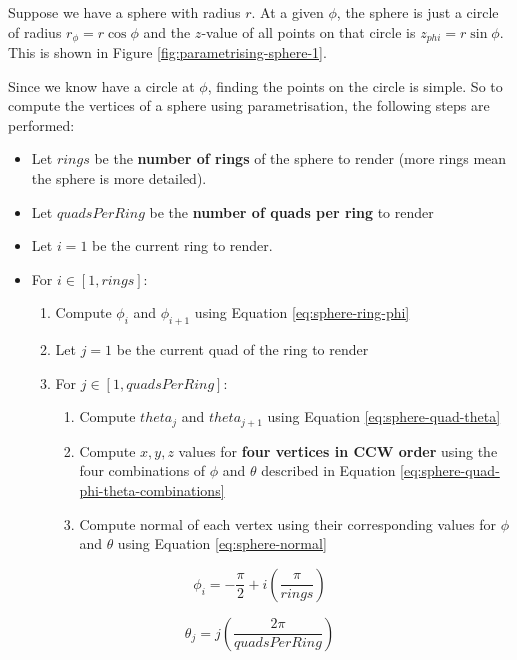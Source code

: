 \documentclass{article}
\begin{document}
Suppose we have a sphere with radius $r$. At a given $\phi$, the sphere is just a circle of radius $r_{\phi} = r \cos \phi$ and the $z$-value of all points on that circle is $z_{phi} = r \sin \phi$. This is shown in Figure \ref{fig:parametrising-sphere-1}.

Since we know have a circle at $\phi$, finding the points on the circle is simple. So to compute the vertices of a sphere using parametrisation, the following steps are performed:
\begin{itemize}
	\item Let $rings$ be the \textbf{number of rings} of the sphere to render (more rings mean the sphere is more detailed).
	\item Let $quadsPerRing$ be the \textbf{number of quads per ring} to render
	\item Let $i = 1$ be the current ring to render.
	\item For $i \in [1,rings]$:
	\begin{enumerate}
		\item Compute $\phi_i$ and $\phi_{i+1}$ using Equation \ref{eq:sphere-ring-phi}
		\item Let $j = 1$ be the current quad of the ring to render
		\item For $j \in [1,quadsPerRing]$:
		\begin{enumerate}
			\item Compute $theta_j$ and $theta_{j+1}$ using Equation \ref{eq:sphere-quad-theta}
			\item Compute $x,y,z$ values for \textbf{four vertices in CCW order} using the four combinations of $\phi$ and $\theta$ described in Equation \ref{eq:sphere-quad-phi-theta-combinations}
			\item Compute normal of each vertex using their corresponding values for $\phi$ and $\theta$ using Equation \ref{eq:sphere-normal}
		\end{enumerate}
	\end{enumerate}
\end{itemize}

\begin{equation}
	\phi_i = -\frac{\pi}{2} + i \left( \frac{\pi}{rings} \right)
	\label{eq:sphere-ring-phi}
\end{equation}

\begin{equation}
	\theta_j = j \left( \frac{2 \pi}{quadsPerRing} \right)
	\label{eq:sphere-quad-theta}
\end{equation}
\end{document}
